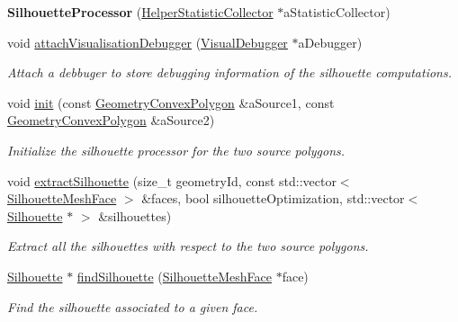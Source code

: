 \begin{DoxyCompactItemize}
\item 
\mbox{\label{classvisilib_1_1_silhouette_processor_a860d9b677347b969cb305265e94c7bf8}} 
{\bfseries Silhouette\+Processor} (\mbox{\hyperlink{classvisilib_1_1_helper_statistic_collector}{Helper\+Statistic\+Collector}} $\ast$a\+Statistic\+Collector)
\item 
\mbox{\label{classvisilib_1_1_silhouette_processor_a9b38305bfb50372badb231710dbd8c41}} 
void \mbox{\hyperlink{classvisilib_1_1_silhouette_processor_a9b38305bfb50372badb231710dbd8c41}{attach\+Visualisation\+Debugger}} (\mbox{\hyperlink{classvisilib_1_1_visual_debugger}{Visual\+Debugger}} $\ast$a\+Debugger)
\begin{DoxyCompactList}\small\item\em Attach a debbuger to store debugging information of the silhouette computations. \end{DoxyCompactList}\item 
\mbox{\label{classvisilib_1_1_silhouette_processor_a8225d6744e57ae62d2f649e50fd4b0a2}} 
void \mbox{\hyperlink{classvisilib_1_1_silhouette_processor_a8225d6744e57ae62d2f649e50fd4b0a2}{init}} (const \mbox{\hyperlink{classvisilib_1_1_geometry_convex_polygon}{Geometry\+Convex\+Polygon}} \&a\+Source1, const \mbox{\hyperlink{classvisilib_1_1_geometry_convex_polygon}{Geometry\+Convex\+Polygon}} \&a\+Source2)
\begin{DoxyCompactList}\small\item\em Initialize the silhouette processor for the two source polygons. \end{DoxyCompactList}\item 
void \mbox{\hyperlink{classvisilib_1_1_silhouette_processor_adf8cb49855ad70e3994ff65bc4740fb2}{extract\+Silhouette}} (size\+\_\+t geometry\+Id, const std\+::vector$<$ \mbox{\hyperlink{classvisilib_1_1_silhouette_mesh_face}{Silhouette\+Mesh\+Face}} $>$ \&faces, bool silhouette\+Optimization, std\+::vector$<$ \mbox{\hyperlink{classvisilib_1_1_silhouette}{Silhouette}} $\ast$ $>$ \&silhouettes)
\begin{DoxyCompactList}\small\item\em Extract all the silhouettes with respect to the two source polygons. \end{DoxyCompactList}\item 
\mbox{\hyperlink{classvisilib_1_1_silhouette}{Silhouette}} $\ast$ \mbox{\hyperlink{classvisilib_1_1_silhouette_processor_a8b2f9edf695dd88b637e4a8b663214a0}{find\+Silhouette}} (\mbox{\hyperlink{classvisilib_1_1_silhouette_mesh_face}{Silhouette\+Mesh\+Face}} $\ast$face)
\begin{DoxyCompactList}\small\item\em Find the silhouette associated to a given face. \end{DoxyCompactList}\end{DoxyCompactItemize}
